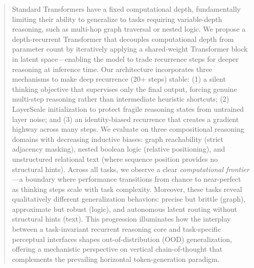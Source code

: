 \begin{abstract}

Standard Transformers have a fixed computational depth, fundamentally limiting their ability to generalize to tasks requiring variable-depth reasoning, such as multi-hop graph traversal or nested logic. We propose a depth-recurrent Transformer that decouples computational depth from parameter count by iteratively applying a shared-weight Transformer block in latent space---enabling the model to trade recurrence steps for deeper reasoning at inference time. Our architecture incorporates three mechanisms to make deep recurrence (20+ steps) stable: (1) a silent thinking objective that supervises only the final output, forcing genuine multi-step reasoning rather than intermediate heuristic shortcuts; (2) LayerScale initialization to protect fragile reasoning states from untrained layer noise; and (3) an identity-biased recurrence that creates a gradient highway across many steps. We evaluate on three compositional reasoning domains with decreasing inductive biases: graph reachability (strict adjacency masking), nested boolean logic (relative positioning), and unstructured relational text (where sequence position provides no structural hints). Across all tasks, we observe a clear \emph{computational frontier}---a boundary where performance transitions from chance to near-perfect as thinking steps scale with task complexity. Moreover, these tasks reveal qualitatively different generalization behaviors: precise but brittle (graph), approximate but robust (logic), and autonomous latent routing without structural hints (text). This progression illuminates how the interplay between a task-invariant recurrent reasoning core and task-specific perceptual interfaces shapes out-of-distribution (OOD) generalization, offering a mechanistic perspective on vertical chain-of-thought that complements the prevailing horizontal token-generation paradigm.

\end{abstract}
